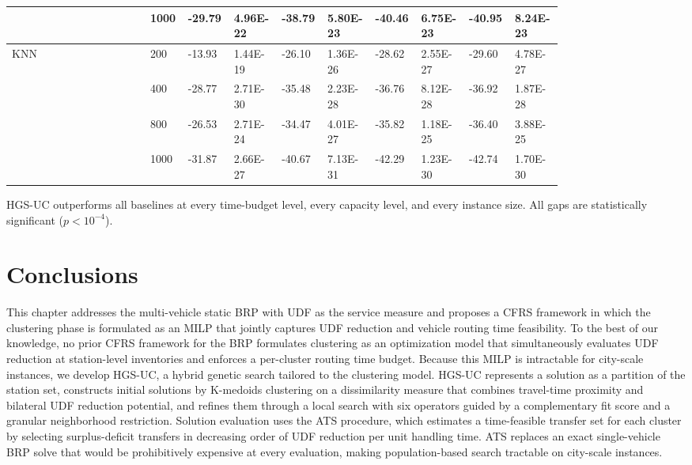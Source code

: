 \begin{landscape}
\begin{longtable}{@{}L{0.24\linewidth}C{0.05\linewidth}*{8}{R{0.065\linewidth}}@{}}
 & 1000 & -29.79 & 4.96E-22 & -38.79 & 5.80E-23 & -40.46 & 6.75E-23 & -40.95 & 8.24E-23 \\
\midrule
KNN & 200 & -13.93 & 1.44E-19 & -26.10 & 1.36E-26 & -28.62 & 2.55E-27 & -29.60 & 4.78E-27 \\
 & 400 & -28.77 & 2.71E-30 & -35.48 & 2.23E-28 & -36.76 & 8.12E-28 & -36.92 & 1.87E-28 \\
 & 800 & -26.53 & 2.71E-24 & -34.47 & 4.01E-27 & -35.82 & 1.18E-25 & -36.40 & 3.88E-25 \\
 & 1000 & -31.87 & 2.66E-27 & -40.67 & 7.13E-31 & -42.29 & 1.23E-30 & -42.74 & 1.70E-30 \\
\end{longtable}
\end{landscape}

HGS-UC outperforms all baselines at every time-budget level, every capacity level, and every instance size. All gaps are statistically significant ($p<10^{-4}$).

\section{Conclusions}\label{ch3:sec:conclusions}

This chapter addresses the multi-vehicle static BRP with UDF as the service measure and proposes a CFRS framework in which the clustering phase is formulated as an MILP that jointly captures UDF reduction and vehicle routing time feasibility. To the best of our knowledge, no prior CFRS framework for the BRP formulates clustering as an optimization model that simultaneously evaluates UDF reduction at station-level inventories and enforces a per-cluster routing time budget. Because this MILP is intractable for city-scale instances, we develop HGS-UC, a hybrid genetic search tailored to the clustering model. HGS-UC represents a solution as a partition of the station set, constructs initial solutions by K-medoids clustering on a dissimilarity measure that combines travel-time proximity and bilateral UDF reduction potential, and refines them through a local search with six operators guided by a complementary fit score and a granular neighborhood restriction. Solution evaluation uses the ATS procedure, which estimates a time-feasible transfer set for each cluster by selecting surplus-deficit transfers in decreasing order of UDF reduction per unit handling time. ATS replaces an exact single-vehicle BRP solve that would be prohibitively expensive at every evaluation, making population-based search tractable on city-scale instances.

